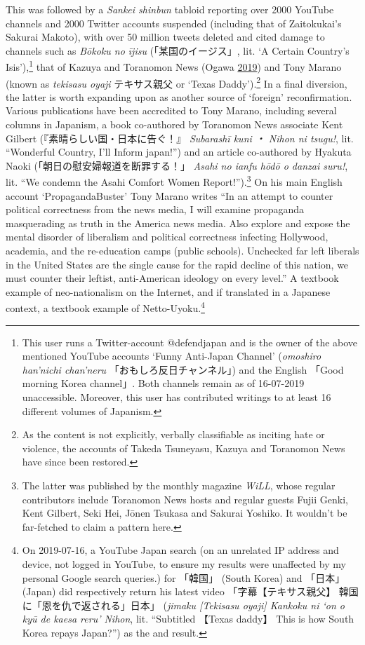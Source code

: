 \documentclass[10pt,british,A4paper,,openany]{memoir}
\begin{document}
This was followed by a \emph{Sankei shinbun} tabloid reporting over 2000
YouTube channels and 2000 Twitter accounts suspended (including that of
Zaitokukai's Sakurai Makoto), with over 50 million tweets deleted and
cited damage to channels such as \emph{Bōkoku no ījisu}
(「某国のイージス」, lit. `A Certain Country's Isis'),\footnote{This
  user runs a Twitter-account @defendjapan and is the owner of the above
  mentioned YouTube accounts `Funny Anti-Japan Channel' (\emph{omoshiro
  han'nichi chan'neru} 「おもしろ反日チャンネル」) and the English
  「Good morning Korea channel」. Both channels remain as of 16-07-2019
  unaccessible. Moreover, this user has contributed writings to at least
  16 different volumes of Japanism.} that of Kazuya and Toranomon News
(Ogawa \protect\hyperlink{ref-ogawa_eng._2019}{2019}) and Tony Marano
(known as \emph{tekisasu oyaji} テキサス親父 or `Texas
Daddy').\footnote{As the content is not explicitly, verbally
  classifiable as inciting hate or violence, the accounts of Takeda
  Tsuneyasu, Kazuya and Toranomon News have since been restored.} In a
final diversion, the latter is worth expanding upon as another source of
`foreign' reconfirmation. Various publications have been accredited to
Tony Marano, including several columns in Japanism, a book co-authored
by Toranomon News associate Kent Gilbert (『素晴らしい国・日本に告ぐ！』
\emph{Subarashī kuni ・ Nihon ni tsugu!}, lit. ``Wonderful Country, I'll
Inform japan!'') and an article co-authored by Hyakuta Naoki
(「朝日の慰安婦報道を断罪する！」 \emph{Asahi no ianfu hōdō o danzai
suru!}, lit. ``We condemn the Asahi Comfort Women Report!'').\footnote{The
  latter was published by the monthly magazine \emph{WiLL}, whose
  regular contributors include Toranomon News hosts and regular guests
  Fujii Genki, Kent Gilbert, Seki Hei, Jōnen Tsukasa and Sakurai
  Yoshiko. It wouldn't be far-fetched to claim a pattern here.} On his
main English account `PropagandaBuster' Tony Marano writes ``In an
attempt to counter political correctness from the news media, I will
examine propaganda masquerading as truth in the America news media. Also
explore and expose the mental disorder of liberalism and political
correctness infecting Hollywood, academia, and the re-education camps
(public schools). Unchecked far left liberals in the United States are
the single cause for the rapid decline of this nation, we must counter
their leftist, anti-American ideology on every level.'' A textbook
example of neo-nationalism on the Internet, and if translated in a
Japanese context, a textbook example of Netto-Uyoku.\footnote{On
  2019-07-16, a YouTube Japan search (on an unrelated IP address and
  device, not logged in YouTube, to ensure my results were unaffected by
  my personal Google search queries.) for 「韓国」 (South Korea) and
  「日本」 (Japan) did respectively return his latest video
  「字幕【テキサス親父】 韓国に「恩を仇で返される」日本」 (\emph{jimaku
  {[}Tekisasu oyaji{]} Kankoku ni `on o kyū de kaesa reru' Nihon}, lit.
  ``Subtitled 【Texas daddy】 This is how South Korea repays Japan?'')
  as the  and  result.}
\end{document}
